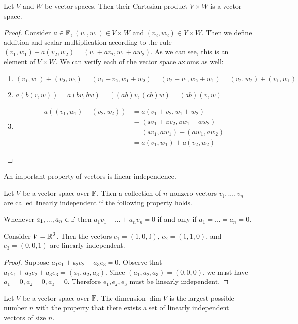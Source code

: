 \begin{example}
    Let $V$ and $W$ be vector spaces. Then their Cartesian product $V \times W$ is a vector space.
\end{example}
\begin{proof}
    Consider $a \in \operatorname{\mathbb{F}}$, $(v_1,w_1) \in V \times W$ and $(v_2,w_2)\in V\times W$. Then we define addition and scalar multiplication according to the rule $(v_1,w_1)+a(v_2,w_2) = (v_1+av_2,w_1+aw_2)$. As we can see, this is an element of $V \times W$. We can verify each of the vector space axioms as well:
    \begin{enumerate}
    \item {
    $(v_1,w_1) + (v_2,w_2) = (v_1+v_2,w_1+w_2) = (v_2+v_1,w_2+w_1) = (v_2,w_2)+(v_1,w_1)$
    }
    \item {
    $a(b(v,w)) = a(bv,bw) = ((ab)v,(ab)w) = (ab)(v,w)$
    }
    \item {
    \begin{align*}
    a((v_1,w_1)+(v_2,w_2)) &= a(v_1+v_2,w_1+w_2)\\
    &= (av_1+av_2,aw_1+aw_2)\\
    &= (av_1,aw_1) + (aw_1,aw_2)\\
    &= a(v_1,w_1)+a(v_2,w_2)
    \end{align*}
    }
    \end{enumerate}
\end{proof}

An important property of vectors is linear independence.
\begin{defn}
    Let $V$ be a vector space over $\operatorname{\mathbb{F}}$. Then a collection of $n$ nonzero vectors $v_1,...,v_n$ are called linearly independent if the following property holds.
    
    Whenever $a_1,...,a_n \in \operatorname{\mathbb{F}}$ then $a_1v_1+...+a_nv_n = 0$ if and only if $a_1=...=a_n=0$. 
\end{defn}
\begin{example}
    Consider $V = \operatorname{\mathbb{R}}^3$. Then the vectors $e_1=(1,0,0)$, $e_2=(0,1,0)$, and $e_3=(0,0,1)$ are linearly independent.
\end{example}
\begin{proof}
Suppose $a_1e_1+a_2e_2+a_3e_3=0$. Observe that $a_1e_1+a_2e_2+a_3e_3 = (a_1,a_2,a_3)$. Since $(a_1,a_2,a_3)=(0,0,0)$, we must have $a_1=0,a_2=0,a_3=0$. Therefore $e_1,e_2,e_3$ must be linearly independent.
\end{proof}

\begin{defn}[Dimension]
    Let $V$ be a vector space over $\operatorname{\mathbb{F}}$. The dimension $\dim V$ is the largest possible number $n$ with the property that there exists a set of linearly independent vectors of size $n$.
\end{defn}

